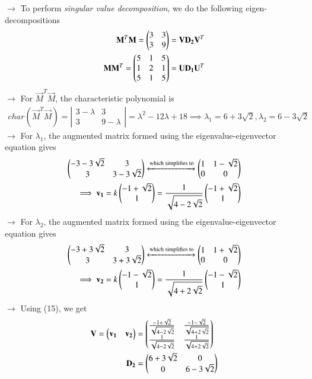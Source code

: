 \documentclass[journal]{IEEEtran}
\begin{document}
$\longrightarrow$ To perform \textit{singular value decomposition}, we do the following eigen-decompositions
\begin{align}
    \mathbf{M}^T\mathbf{M} = \begin{pmatrix}3&3\\3&9\end{pmatrix} = \mathbf{V}\mathbf{D_2}\mathbf{V}^T \\
    \mathbf{M}\mathbf{M}^T = \begin{pmatrix}5&1&5\\1&2&1\\5&1&5\end{pmatrix} = \mathbf{U}\mathbf{D_1}\mathbf{U}^T 
\end{align}
$\rightarrow$ For $\vec{M}^T\vec{M}$, the characteristic polynomial is
\begin{align}
    char(\vec{M}^T\vec{M}) = \left|\begin{array}{cc}3-\lambda&3\\3&9-\lambda\end{array}\right| = \lambda^2 - 12\lambda + 18 
    \implies \lambda_1 = 6 + 3\sqrt{2}, \lambda_2 = 6 - 3\sqrt{2}
\end{align}
$\rightarrow$ For $\lambda_1$, the augmented matrix formed using the eigenvalue-eigenvector equation gives
\begin{align}
    \begin{pmatrix}-3-3\sqrt{2}&3\\3&3-3\sqrt{2}\end{pmatrix}\xleftrightarrow{\text{which simplifies to}}\begin{pmatrix}1&1-\sqrt{2}\\0&0\end{pmatrix} \\
    \implies \mathbf{v_1} = k\begin{pmatrix}-1+\sqrt{2}\\1\end{pmatrix} = \frac{1}{\sqrt{4-2\sqrt{2}}}\begin{pmatrix}-1+\sqrt{2}\\1\end{pmatrix}
\end{align}
$\rightarrow$ For $\lambda_2$, the augmented matrix formed using the eigenvalue-eigenvector equation gives
\begin{align}
    \begin{pmatrix}-3+3\sqrt{2}&3\\3&3+3\sqrt{2}\end{pmatrix}\xleftrightarrow{\text{which simplifies to}}\begin{pmatrix}1&1+\sqrt{2}\\0&0\end{pmatrix} \\
    \implies \mathbf{v_2} = k\begin{pmatrix}-1-\sqrt{2}\\1\end{pmatrix} = \frac{1}{\sqrt{4+2\sqrt{2}}}\begin{pmatrix}-1-\sqrt{2}\\1\end{pmatrix}
\end{align}
$\rightarrow$ Using (15), we get
\begin{align}
    \mathbf{V} = \begin{pmatrix}\mathbf{v_1}&\mathbf{v_2}\end{pmatrix} &= \begin{pmatrix}\frac{-1+\sqrt{2}}{\sqrt{4-2\sqrt{2}}}&\frac{-1-\sqrt{2}}{\sqrt{4+2\sqrt{2}}} \\ \frac{1}{\sqrt{4-2\sqrt{2}}}&\frac{1}{\sqrt{4+2\sqrt{2}}}\end{pmatrix} \\
    \mathbf{D_2} &= \begin{pmatrix}6+3\sqrt{2}&0\\0&6-3\sqrt{2}\end{pmatrix}
\end{align}
\end{document}
